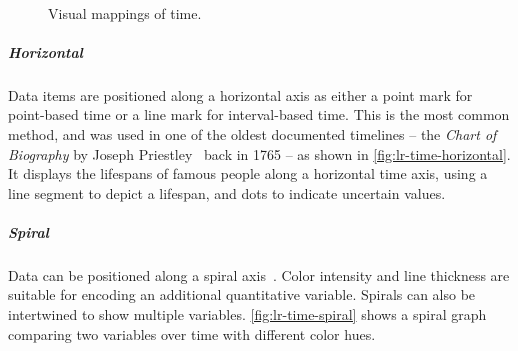 \begin{figure}[!htb]
	\\ \vspace{.5\baselineskip}
	\caption{Visual mappings of time.}
	\label{fig:lr-time}		
\end{figure}
	
\subparagraph{Horizontal} Data items are positioned along a horizontal axis as either a point mark for point-based time or a line mark for interval-based time. This is the most common method, and was used in one of the oldest documented timelines -- the \emph{Chart of Biography} by Joseph Priestley~\cite{Priestley1765} back in 1765 -- as shown in \autoref{fig:lr-time-horizontal}. It displays the lifespans of famous people along a horizontal time axis, using a line segment to depict a lifespan, and dots to indicate uncertain values. 

\subparagraph{Spiral} Data can be positioned along a spiral axis~\cite{Weber2001}. Color intensity and line thickness are suitable for encoding an additional quantitative variable. Spirals can also be intertwined to show multiple variables. \autoref{fig:lr-time-spiral} shows a spiral graph comparing two variables over time with different color hues. 


